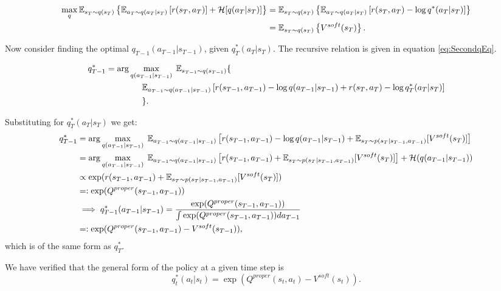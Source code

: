 \documentclass{report}
\numberwithin{equation}{section}
\numberwithin{figure}{section}
\numberwithin{table}{section}
\numberwithin{algorithm}{section}
\begin{document}
\begin{align*}
  \max_{q} \mathbb{E}_{s_T\sim q(s_T)}\left\{\mathbb{E}_{a_T\sim q(a_T|s_T)}\left[
    r(s_T, a_T)
  \right] + \mathcal{H}[q(a_T|s_T)]
  \right\}&=\mathbb{E}_{s_T\sim q(s_T)}\left\{
    \mathbb{E}_{a_T\sim q(a_T|s_T)}\left[
    r(s_T, a_T)
   -\log q^*(a_T|s_T)\right]\right\}\notag\\
   &=\mathbb{E}_{s_T\sim q(s_T)}\left\{
    V^{soft}(s_T)\right\}.
\end{align*}

Now consider finding the optimal $q_{T-1}(a_{T-1}|s_{T-1})$, 
given $q_T^*(a_T|s_T)$. The recursive relation is given 
in equation \ref{eq:SecondqEq}.

\begin{align}\label{eq:SecondqEq}
  q_{T-1}^*&=\arg \max_{q(a_{T-1}|s_{T-1})}\; \mathbb{E}_{s_{T-1}\sim q(s_{T-1})}\{\notag\\
    &\qquad\qquad \;\mathbb{E}_{a_{T-1}\sim q(a_{T-1}|s_{T-1})}
    \left[
      r(s_{T-1},a_{T-1}) - \log q(a_{T-1}|s_{T-1})
      + r(s_{T}, a_T) - \log q^*_{T}(a_T|s_T)
    \right]\notag\\
  &\qquad\qquad\;\}.
\end{align}

Substituting for $q^*_T(a_T|s_T)$ we get:
\begin{align*}
  q^*_{T-1}&=\arg \max_{q(a_{T-1}|s_{T-1})}\;
  \mathbb{E}_{a_{T-1}\sim q(a_{T-1}|s_{T-1})}
  \left[
    r(s_{T-1},a_{T-1}) - \log q(a_{T-1}|s_{T-1})
    + \mathbb{E}_{s_T\sim p(s_{T}|s_{T-1},a_{T-1})}[V^{soft}(s_T)]
  \right]\notag\\
  &=\arg \max_{q(a_{T-1}|s_{T-1})}\;
  \mathbb{E}_{a_{T-1}\sim q(a_{T-1}|s_{T-1})}
  \left[
    r(s_{T-1},a_{T-1}) + \mathbb{E}_{s_T\sim p(s_{T}|s_{T-1},a_{T-1})}[V^{soft}(s_T)]
  \right] + \mathcal{H}(q(a_{T-1}|s_{T-1}))\notag\\
  &\propto \exp(r(s_{T-1},a_{T-1}) + \mathbb{E}_{s_T\sim p(s_{T}|s_{T-1},a_{T-1})}[V^{soft}(s_T)])\notag\\
  &=:\exp(Q^{proper}(s_{T-1}, a_{T-1}))\notag\\
  &\implies q^*_{T-1}(a_{T-1}|s_{T-1})=\frac{\exp(Q^{proper}(s_{T-1}, a_{T-1}))}{\int \exp(Q^{proper}(s_{T-1}, a_{T-1}))da_{T-1}}\notag\\
  &=:\exp(Q^{proper}(s_{T-1},a_{T-1})-V^{soft}(s_{T-1})),
\end{align*}
which is of the same form as $q^*_T$.

We have verified that the general 
form of the policy at a given time step is 
\begin{equation}\label{eq:generalqForm}
  q^*_t(a_t|s_t)=\exp(Q^{proper}(s_t,a_t)-V^{soft}(s_t)). 
\end{equation}
\end{document}
